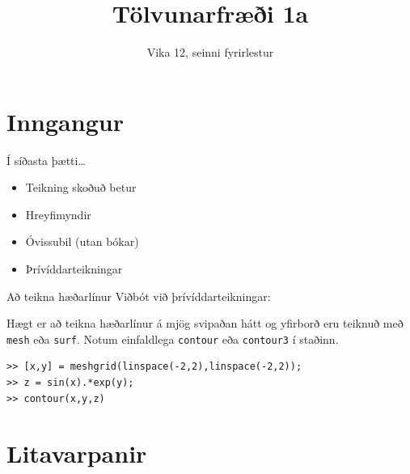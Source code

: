 \documentclass[handout]{beamer}
\title{Tölvunarfræði 1a}
\subtitle{Vika 12, seinni fyrirlestur}
\begin{document}
\begin{frame}
\titlepage
\end{frame}

\section{Inngangur}

\begin{frame}{Í síðasta þætti\ldots}
\begin{itemize}
 \item Teikning skoðuð betur
 \item Hreyfimyndir
 \item Óvissubil (utan bókar)
 \item Þrívíddarteikningar 
\end{itemize}
\end{frame}

\begin{frame}[fragile]{Að teikna hæðarlínur}
Viðbót við þrívíddarteikningar: 

Hægt er að teikna hæðarlínur á mjög svipaðan hátt og yfirborð eru teiknuð með \texttt{mesh} eða \texttt{surf}. Notum einfaldlega \texttt{contour} eða \texttt{contour3} í staðinn.

\begin{verbatim}
>> [x,y] = meshgrid(linspace(-2,2),linspace(-2,2));
>> z = sin(x).*exp(y);
>> contour(x,y,z)
\end{verbatim}

\end{frame}

\section{Litavarpanir}
\end{document}
